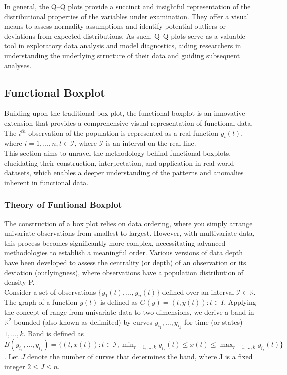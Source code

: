 \documentclass{article}\usepackage[]{graphicx}\usepackage[]{xcolor}
\numberwithin{equation}{section}
\begin{document}
\noindent In general, the Q–Q plots provide a succinct and insightful representation of the distributional properties of the variables under examination. They offer a visual means to assess normality assumptions and identify potential outliers or deviations from expected distributions. As such, Q–Q plots serve as a valuable tool in exploratory data analysis and model diagnostics, aiding researchers in understanding the underlying structure of their data and guiding subsequent analyses.

\subsection{Functional Boxplot}

\noindent
Building upon the traditional box plot, the functional boxplot is an innovative extension that provides a comprehensive visual representation of functional data. The $i^{th}$ observation of the population is represented as a real function $y_i(t)$, where $i = 1, \dots , n, t \in \mathcal{I}$, where $\mathcal{I}$ is an interval on the real line.\\

\noindent
This section aims to unravel the methodology behind functional boxplots, elucidating their construction, interpretation, and application in real-world datasets, which enables a deeper understanding of the patterns and anomalies inherent in functional data.

\subsubsection{Theory of Funtional Boxplot}

The construction of a box plot relies on data ordering, where you simply arrange univariate observations from smallest to largest. However, with multivariate data, this process becomes significantly more complex, necessitating advanced methodologies to establish a meaningful order. Various versions of data depth have been developed to assess the centrality (or depth) of an observation or its deviation (outlyingness), where observations have a population distribution of density P.\\

\noindent
Consider a set of observations $\{y_1(t),\dots,y_n(t)\}$ defined over an interval $\mathcal{I} \in \mathbb{R}$. The graph of a function $y(t)$ is defined as $G(y) = {(t,y(t)) : t \in I}$. Applying the concept of range from univariate data to two dimensions, we derive a band in $\mathbb{R}^2$ bounded (also known as delimited) by curves $y_{i_1},\dots, y_{i_k}$ for time (or states) $1, \dots, k$. Band is defined as $B(y_{i_1},\dots,y_{i_k}) = \{(t,x(t)): t \in \mathcal{I}, \min_{r=1,\dots,k} y_{i_r}(t) \leq x(t) \leq \max_{r=1,\dots,k} y_{i_r}(t)\}$. Let $J$ denote the number of curves that determines the band, where J is a fixed integer $2 \le J \le n$.\\
\end{document}
